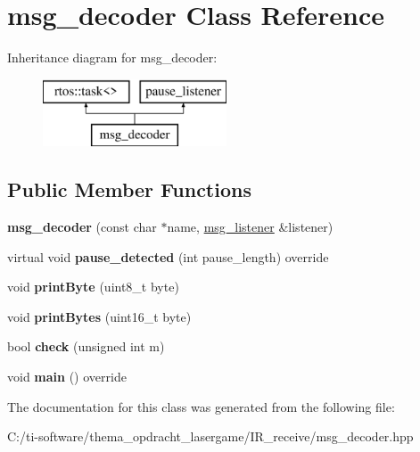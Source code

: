 \hypertarget{classmsg__decoder}{}\section{msg\+\_\+decoder Class Reference}
\label{classmsg__decoder}
Inheritance diagram for msg\+\_\+decoder\+:\begin{figure}[H]
\begin{center}
\leavevmode
\includegraphics[height=2.000000cm]{classmsg__decoder}
\end{center}
\end{figure}
\subsection*{Public Member Functions}
\begin{DoxyCompactItemize}
\item 
\mbox{\label{classmsg__decoder_ae9b18eff0ca3fc3d3c9248e4e38fd246}} 
{\bfseries msg\+\_\+decoder} (const char $\ast$name, \mbox{\hyperlink{classmsg__listener}{msg\+\_\+listener}} \&listener)
\item 
\mbox{\label{classmsg__decoder_a990f6ed2f479d61c8fbd0ceeba80a165}} 
virtual void {\bfseries pause\+\_\+detected} (int pause\+\_\+length) override
\item 
\mbox{\label{classmsg__decoder_a346301483ec894f687c93227d09a00a6}} 
void {\bfseries print\+Byte} (uint8\+\_\+t byte)
\item 
\mbox{\label{classmsg__decoder_af25ea64b8c252a82e879451c1fce6d24}} 
void {\bfseries print\+Bytes} (uint16\+\_\+t byte)
\item 
\mbox{\label{classmsg__decoder_a17ed2804e6ec965a054b53e54b257d30}} 
bool {\bfseries check} (unsigned int m)
\item 
\mbox{\label{classmsg__decoder_a8954f1ed668d0428ab4191ba6013c659}} 
void {\bfseries main} () override
\end{DoxyCompactItemize}


The documentation for this class was generated from the following file\+:\begin{DoxyCompactItemize}
\item 
C\+:/ti-\/software/thema\+\_\+opdracht\+\_\+lasergame/\+I\+R\+\_\+receive/msg\+\_\+decoder.\+hpp\end{DoxyCompactItemize}
